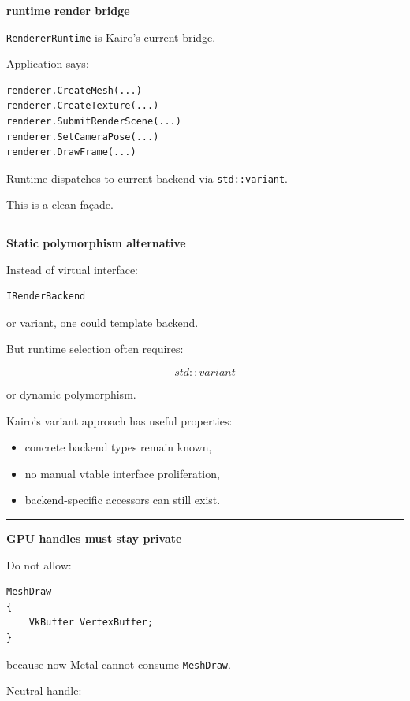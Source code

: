 \textbf{runtime render bridge}

\texttt{RendererRuntime} is Kairo's current bridge.

Application says:

\begin{verbatim}
renderer.CreateMesh(...)
renderer.CreateTexture(...)
renderer.SubmitRenderScene(...)
renderer.SetCameraPose(...)
renderer.DrawFrame(...)
\end{verbatim}

Runtime dispatches to current backend via \texttt{std::variant}.

This is a clean façade.

\begin{center}\rule{0.5\linewidth}{0.5pt}\end{center}

\textbf{Static polymorphism alternative}

Instead of virtual interface:

\begin{verbatim}
IRenderBackend
\end{verbatim}

or variant, one could template backend.

But runtime selection often requires:

\[
std::variant
\]

or dynamic polymorphism.

Kairo's variant approach has useful properties:

\begin{itemize}
\tightlist
\item
  concrete backend types remain known,
\item
  no manual vtable interface proliferation,
\item
  backend-specific accessors can still exist.
\end{itemize}

\begin{center}\rule{0.5\linewidth}{0.5pt}\end{center}

\textbf{GPU handles must stay private}

Do not allow:

\begin{verbatim}
MeshDraw
{
    VkBuffer VertexBuffer;
}
\end{verbatim}

because now Metal cannot consume \texttt{MeshDraw}.

Neutral handle:

